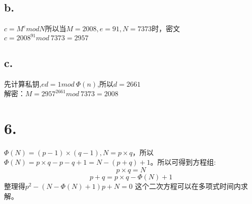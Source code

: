 \documentclass{article}
\begin{document}
	\subsection*{b.}
	$c=M^{e}modN$所以当$M=2008,e=91,N=7373$时，密文$c=2008^{91}mod\ 7373=2957$
	\subsection*{c.}
	先计算私钥,$ed=1mod\ \Phi(n)$,所以$d=2661$\\
	解密：$M=2957^{2661}mod\ 7373=2008$
	\section*{6.}
	$\Phi(N)=(p-1)\times(q-1),N=p\times q$，所以$\Phi(N)=p\times q-p-q+1=N-(p+q)+1$。所以可得到方程组:
	$$p\times q = N$$
	$$p+q = p\times q-\Phi(N)+1$$
	整理得$p^2-(N-\Phi(N)+1)p+N=0$
	这个二次方程可以在多项式时间内求解。
\end{document}

